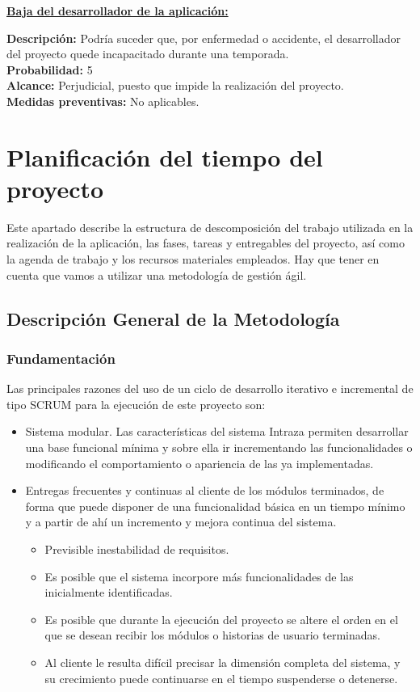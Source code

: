	\begin{shaded}
		\underline{\textbf{Baja del desarrollador de la aplicación:}}
		\begin{flushleft}	
			\textbf{Descripción:} Podría suceder que, por enfermedad o accidente, el desarrollador del proyecto quede incapacitado durante una temporada.\\
			\textbf{Probabilidad:} 5\\
			\textbf{Alcance:} Perjudicial, puesto que impide la realización del proyecto.\\
			\textbf{Medidas preventivas:} No aplicables.
		\end{flushleft}			
	\end{shaded}
	
\chapter{Planificación del tiempo del proyecto}

\hspace*{2em}Este apartado describe la estructura de descomposición del trabajo utilizada en la realización de la aplicación, las fases, tareas y entregables del proyecto, así como la agenda de trabajo y los recursos materiales empleados. Hay que tener en cuenta que vamos a utilizar una metodología de gestión ágil.\cite{scrum}
\section{Descripción General de la Metodología}
\subsection{Fundamentación}

Las principales razones del uso de un ciclo de desarrollo iterativo e incremental de tipo SCRUM para la ejecución de este proyecto son:
\begin{itemize}
	\item Sistema modular. Las características del sistema Intraza permiten desarrollar una base funcional mínima y sobre ella ir incrementando las funcionalidades o modificando el comportamiento o apariencia de las ya implementadas.
	\item Entregas frecuentes y continuas al cliente de los módulos terminados, de forma que puede disponer de una funcionalidad básica en un tiempo mínimo y a partir de ahí un incremento y mejora continua del sistema.
	\begin{itemize}
		\item 	Previsible inestabilidad de requisitos.
		\item 	Es posible que el sistema incorpore más funcionalidades de las inicialmente identificadas.
		\item 	Es posible que durante la ejecución del proyecto se altere el orden en el que se desean recibir los módulos o historias de usuario terminadas.
		\item 	Al cliente le resulta difícil precisar la dimensión completa del sistema, y su crecimiento puede continuarse en el tiempo suspenderse o detenerse.
	\end{itemize}
\end{itemize}

